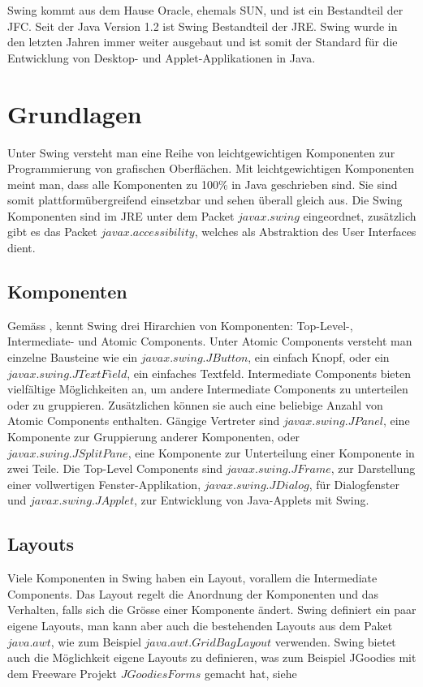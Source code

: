   Swing kommt aus dem Hause Oracle, ehemals SUN, und ist ein Bestandteil der
  \ac{JFC}. Seit der Java Version 1.2 ist Swing Bestandteil der \ac{JRE}. Swing
  wurde in den letzten Jahren immer weiter ausgebaut und ist somit der Standard
  für die Entwicklung von Desktop- und Applet-Applikationen in Java.
  
  \section{Grundlagen}
  
  Unter Swing versteht man eine Reihe von leichtgewichtigen Komponenten zur
  Programmierung von grafischen Oberflächen. Mit leichtgewichtigen Komponenten
  meint man, dass alle Komponenten zu 100\% in Java geschrieben sind. Sie sind
  somit plattformübergreifend einsetzbar und sehen überall gleich aus. Die Swing
  Komponenten sind im \ac{JRE} unter dem Packet \(javax.swing\) eingeordnet,
  zusätzlich gibt es das Packet \(javax.accessibility\), welches als
  Abstraktion des User Interfaces dient.
  
  \subsection{Komponenten}
  
  Gemäss \cite{SwingComponentsHighscore}, kennt Swing drei Hirarchien von
  Komponenten: Top-Level-, Intermediate- und Atomic Components.
  Unter Atomic Components versteht man einzelne Bausteine wie ein
  \(javax.swing.JButton\), ein einfach Knopf, oder ein
  \(javax.swing.JTextField\), ein einfaches Textfeld.
  Intermediate Components bieten vielfältige Möglichkeiten an, um andere
  Intermediate Components zu unterteilen oder zu gruppieren. Zusätzlichen
  können sie auch eine beliebige Anzahl von Atomic Components enthalten. Gängige
  Vertreter sind \(javax.swing.JPanel\), eine Komponente zur Gruppierung anderer
  Komponenten, oder \(javax.swing.JSplitPane\), eine Komponente zur
  Unterteilung einer Komponente in zwei Teile.
  Die Top-Level Components sind \(javax.swing.JFrame\),
  zur Darstellung einer vollwertigen Fenster-Applikation,
  \(javax.swing.JDialog\), für Dialogfenster und \(javax.swing.JApplet\), zur
  Entwicklung von Java-Applets mit Swing.
  
  \subsection{Layouts}
  
  Viele Komponenten in Swing haben ein Layout, vorallem die Intermediate
  Components. Das Layout regelt die Anordnung der Komponenten und das Verhalten,
  falls sich die Grösse einer Komponente ändert. Swing definiert ein paar eigene
  Layouts, man kann aber auch die bestehenden Layouts aus dem Paket
  \(java.awt\), wie zum Beispiel \(java.awt.GridBagLayout\) verwenden. Swing
  bietet auch die Möglichkeit eigene Layouts zu definieren, was zum Beispiel
  JGoodies mit dem Freeware Projekt \(JGoodies Forms\) gemacht hat, siehe
  \cite{JGoodiesForms}
    
